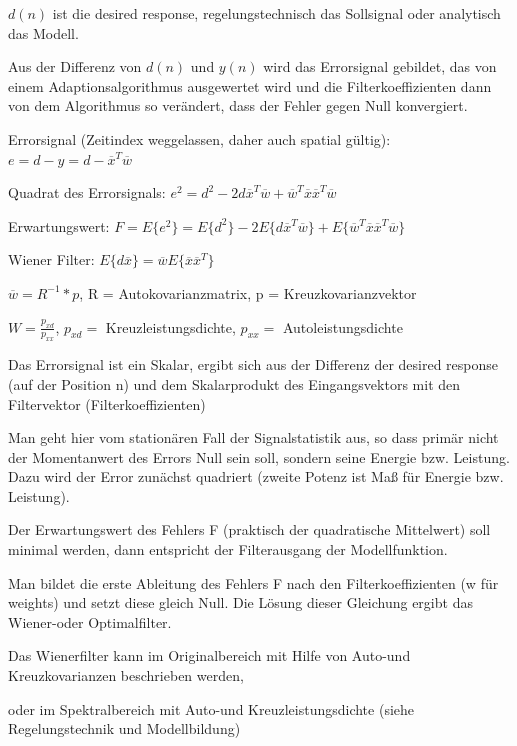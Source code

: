 \documentclass[a4paper]{article}
\begin{document}
\begin{multicols}{3}
\begin{itemize*}
    \item $d(n)$ ist die desired response, regelungstechnisch das Sollsignal oder analytisch das Modell.
    \item Aus der Differenz von $d(n)$ und $y(n)$ wird das Errorsignal gebildet, das von einem Adaptionsalgorithmus ausgewertet wird und die Filterkoeffizienten dann von dem Algorithmus so verändert, dass der Fehler gegen Null konvergiert.
    \item Errorsignal (Zeitindex weggelassen, daher auch spatial gültig): $e=d-y=d-\overline{x}^T \overline{w}$
    \item Quadrat des Errorsignals: $e^2=d^2-2d\overline{x}^T\overline{w}+\overline{w}^T\overline{x}\overline{x}^T\overline{w}$
    \item Erwartungswert: $F=E\{e^2\}=E\{d^2\}-2E\{d\overline{x}^T\overline{w}\}+E\{\overline{w}^T\overline{x}\overline{x}^T\overline{w}\}$
    \item Wiener Filter: $E\{d\overline{x}\}=\overline{w}E\{\overline{x}\overline{x}^T\}$
    \begin{itemize*}
      \item $\overline{w}=R^{-1}*p$, R = Autokovarianzmatrix, p = Kreuzkovarianzvektor
      \item $W=\frac{p_{xd}}{p_{xx}}$, $p_{xd}=$ Kreuzleistungsdichte, $p_{xx}=$ Autoleistungsdichte
    \end{itemize*}
    \item Das Errorsignal ist ein Skalar, ergibt sich aus der Differenz der desired response (auf der Position n) und dem Skalarprodukt des Eingangsvektors mit den Filtervektor (Filterkoeffizienten)
    \item Man geht hier vom stationären Fall der Signalstatistik aus, so dass primär nicht der Momentanwert des Errors Null sein soll, sondern seine Energie bzw. Leistung. Dazu wird der Error zunächst quadriert (zweite Potenz ist Maß für Energie bzw. Leistung).
    \item Der Erwartungswert des Fehlers F (praktisch der quadratische Mittelwert) soll minimal werden, dann entspricht der Filterausgang der Modellfunktion.
    \item Man bildet die erste Ableitung des Fehlers F nach den Filterkoeffizienten (w für weights) und setzt diese gleich Null. Die Lösung dieser Gleichung ergibt das Wiener-oder Optimalfilter.
    \item Das Wienerfilter kann im Originalbereich mit Hilfe von Auto-und Kreuzkovarianzen beschrieben werden,
    \item oder im Spektralbereich mit Auto-und Kreuzleistungsdichte (siehe Regelungstechnik und Modellbildung)

\end{itemize*}
\end{multicols}
\end{document}
